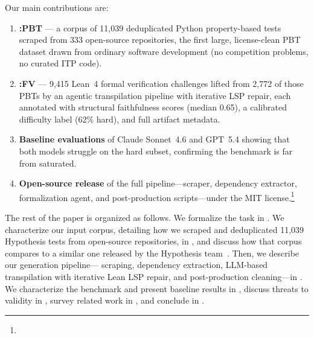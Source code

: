 Our main contributions are:
\begin{enumerate}
  \item \textbf{\FVSpec:PBT} — a corpus of 11{,}039 deduplicated Python property-based tests scraped from 333 open-source repositories, the first large, license-clean PBT dataset drawn from ordinary software development (no competition problems, no curated ITP code).
  \item \textbf{\FVSpec:FV} — 9{,}415 Lean~4 formal verification challenges lifted from 2{,}772 of those PBTs by an agentic transpilation pipeline with iterative LSP repair, each annotated with structural faithfulness scores (median 0.65), a calibrated difficulty label (62\% hard), and full artifact metadata.
  \item \textbf{Baseline evaluations} of Claude Sonnet~4.6 and GPT~5.4 showing that both models struggle on the hard subset, confirming the benchmark is far from saturated.
  \item \textbf{Open-source release} of the full pipeline---scraper, dependency extractor, formalization agent, and post-production scripts---under the MIT license.\footnote{\TODO}
\end{enumerate}



The rest of the paper is organized as follows.
We formalize the task in .
We characterize our input corpus, detailing how we scraped and deduplicated 11{,}039 Hypothesis tests from open-source repositories, in ,
and discuss how that corpus compares to a similar one released by the Hypothesis team~\cite{devoe2026hypothesis}.
Then, we describe our generation pipeline---
scraping,
dependency extraction, LLM-based transpilation with iterative Lean LSP repair, and post-production cleaning---in .
We characterize the benchmark and present baseline results in , discuss threats to validity in , survey related work in , and conclude in .